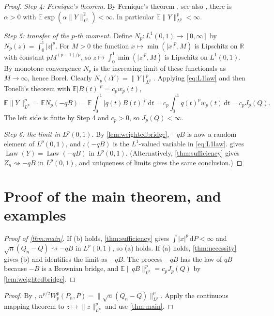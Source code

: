 \documentclass[11pt]{amsart}
\newtheorem{corollary}[theorem]{Corollary}
\theoremstyle{remark}
\newcommand{\R}{\mathbb{R}}
\newcommand{\E}{\mathbb{E}}
\newcommand{\dd}{\,\mathrm{d}}
\newcommand{\Lp}{L^p(0,1)}
\newcommand{\weak}{\rightsquigarrow}
\DeclareMathOperator{\Law}{Law}
\begin{document}
\begin{proof}
\emph{Step 4: Fernique's theorem.} By Fernique's theorem \cite{Fernique1970}, see also \cite[Theorem~2.8.5]{Bogachev1998}, there is $\alpha>0$ with $\E\exp(\alpha\|Y\|_{L^p}^2)<\infty$. In particular $\E\|Y\|_{L^p}^p<\infty$.

\emph{Step 5: transfer of the $p$-th moment.} Define $N_p:L^1(0,1)\to[0,\infty]$ by $N_p(z)=\int_0^1|z|^p$. For $M>0$ the function $x\mapsto\min(|x|^p,M)$ is Lipschitz on $\R$ with constant $pM^{(p-1)/p}$, so $z\mapsto\int_0^1\min(|z|^p,M)$ is Lipschitz on $L^1(0,1)$. By monotone convergence $N_p$ is the increasing limit of these functionals as $M\to\infty$, hence Borel. Clearly $N_p(\iota Y)=\|Y\|_{L^p}^p$. Applying \eqref{eq:L1law} and then Tonelli's theorem with $\E|B(t)|^p=c_pw_p(t)$,
\[
\E\|Y\|_{L^p}^p=\E N_p(-qB)=\E\int_0^1|q(t)B(t)|^p\dd t=c_p\int_0^1q(t)^pw_p(t)\dd t=c_pJ_p(Q).
\]
The left side is finite by Step 4 and $c_p>0$, so $J_p(Q)<\infty$.

\emph{Step 6: the limit in $\Lp$.} By \cref{lem:weightedbridge}, $-qB$ is now a random element of $\Lp$, and $\iota(-qB)$ is the $L^1$-valued variable in \eqref{eq:L1law}.  gives $\Law(Y)=\Law(-qB)$ in $\Lp$. (Alternatively, \cref{thm:sufficiency} gives $Z_n\weak-qB$ in $\Lp$, and uniqueness of limits gives the same conclusion.)
\end{proof}

\section{Proof of the main theorem, and examples}\label{sec:proof}

\begin{proof}[Proof of \cref{thm:main}]
If (b) holds, \cref{thm:sufficiency} gives $\int|x|^p\dd P<\infty$ and $\sqrt n(Q_n-Q)\weak-qB$ in $\Lp$, so (a) holds. If (a) holds, \cref{thm:necessity} gives (b) and identifies the limit as $-qB$. The process $-qB$ has the law of $qB$ because $-B$ is a Brownian bridge, and $\E\|qB\|_{L^p}^p=c_pJ_p(Q)$ by \cref{lem:weightedbridge}.
\end{proof}


\begin{proof}
By \cite[Theorem~2.10]{BobkovLedoux2019}, $n^{p/2}W_p^p(P_n,P)=\|\sqrt n(Q_n-Q)\|_{L^p}^p$. Apply the continuous mapping theorem to $z\mapsto\|z\|_{L^p}^p$ and use \cref{thm:main}.
\end{proof}
\end{document}
